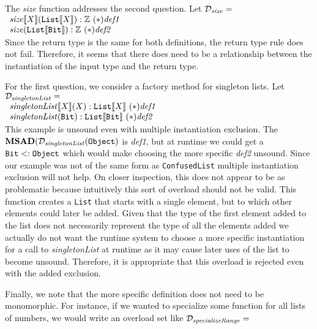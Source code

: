 \documentclass[preprint]{sigplanconf}
\newcommand{\ob}[1]{\ensuremath{\llbracket {#1} \rrbracket}}
\begin{document}
The {\it size} function addresses the second question.  Let $\mathcal{D}_{{\it size}}=$\\

$\begin{array}{l}
{\it size}\ob{X}({\tt List}\ob{X}) : \mathbb{Z}~(*){\it def1}\\
{\it size}({\tt List}\ob{{\tt Bit}}) : \mathbb{Z}~(*){\it def2}\\
\end{array}$\\

Since the return type is the same for both definitions, the return type rule does not fail.
Therefore, it seems that there does need to be a relationship between the instantiation
of the input type and the return type.

For the first question, we consider a factory method for singleton lists.  Let $\mathcal{D}_{{\it singletonList}}=$\\

$\begin{array}{l}
{\it singletonList}\ob{X}(X) : {\tt List}\ob{X}~(*){\it def1}\\
{\it singletonList}({\tt Bit}) : {\tt List}\ob{{\tt Bit}}~(*){\it def2}\\
\end{array}$\\

This example is unsound even with multiple instantiation exclusion.  
The ${\bf MSAD}(\mathcal{D}_{{\it singletonList}}({\tt Object})$ is {\it def1}, but
at runtime we could get a ${\tt Bit} <: {\tt Object}$ which would make choosing
the more specific {\it def2} unsound.  Since our example was not of the same
form as {\tt ConfusedList} multiple instantiation exclusion will not help.
On closer inspection, this does not appear to be as problematic because intuitively
this sort of overload should not be valid.  This function creates a {\tt List} that starts with a single element, but to which
other elements could later be added.  Given that the type of the first element added to
the list does not necessarily represent the type of all the elements added we actually
do not want the runtime system to choose a more specific instantiation for a call to
{\it singletonList} at runtime as it may cause later uses of the list to become unsound.  
Therefore, it is appropriate that this overload is rejected even with the added exclusion.

Finally, we note that the more specific definition does not need to be monomorphic.
For instance, if we wanted to specialize some function for all lists of numbers, we 
would write an overload set like $\mathcal{D}_{{\it specializeRange}}=$\\
\end{document}
